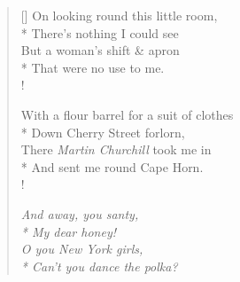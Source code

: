 \documentclass[MAIN]{subfiles}
\begin{document}
\begin{verse}[\versewidth]
On looking round this little room,\\*
\vin There's nothing I could see\\
But a woman's shift \& apron\\*
\vin That were no use to me.\\!

With a flour barrel for a suit of clothes\\*
\vin Down {\sc Cherry Street} forlorn,\\
There \emph{Martin Churchill} took me in\\*
\vin And sent me round {\sc Cape Horn}.\\!

{\it And away, you santy,\\*
\vin My dear honey!\\
O you {\sc New York} girls,\\*
\vin Can't you dance the polka?}
\end{verse}
\end{document}
